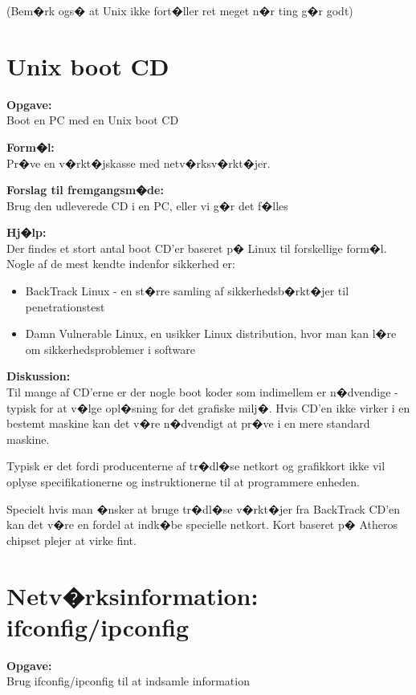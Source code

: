 \documentclass[a4paper,11pt,notitlepage]{oevelser}
\begin{document}
(Bem�rk ogs� at Unix ikke fort�ller ret meget n�r ting g�r godt)


\chapter{Unix boot CD}
\label{ex:unix-boot-cd}

{\bfseries Opgave:}\\
Boot en PC med en Unix boot CD

{\bfseries Form�l:}\\
Pr�ve en v�rkt�jskasse med netv�rksv�rkt�jer.

{\bfseries Forslag til fremgangsm�de:}\\
Brug den udleverede CD i en PC, eller vi g�r det f�lles

{\bfseries Hj�lp:}\\
Der findes et stort antal boot CD'er baseret p� Linux til forskellige
form�l. Nogle af de mest kendte indenfor sikkerhed er:
\begin{itemize}
\item BackTrack Linux - en st�rre
  samling af sikkerhedsb�rkt�jer til penetrationstest
\item Damn Vulnerable Linux, en usikker Linux distribution, hvor man
  kan l�re om sikkerhedsproblemer i software
\end{itemize}

{\bf Diskussion:}\\
Til mange af CD'erne er der nogle boot koder som indimellem er
n�dvendige - typisk for at v�lge opl�sning for det grafiske
milj�. Hvis CD'en ikke virker i en bestemt maskine kan det v�re
n�dvendigt at pr�ve i en mere standard maskine.

Typisk er det fordi producenterne af tr�dl�se netkort og grafikkort
ikke vil oplyse specifikationerne og instruktionerne til at
programmere enheden.

Specielt hvis man �nsker at bruge tr�dl�se v�rkt�jer fra BackTrack
CD'en kan det v�re en fordel at indk�be specielle netkort. Kort
baseret p� Atheros chipset plejer at virke fint.



\chapter{Netv�rksinformation: ifconfig/ipconfig}
\label{ex:network-ifconfig}

{\bfseries Opgave:}\\
Brug ifconfig/ipconfig til at indsamle information
\end{document}
